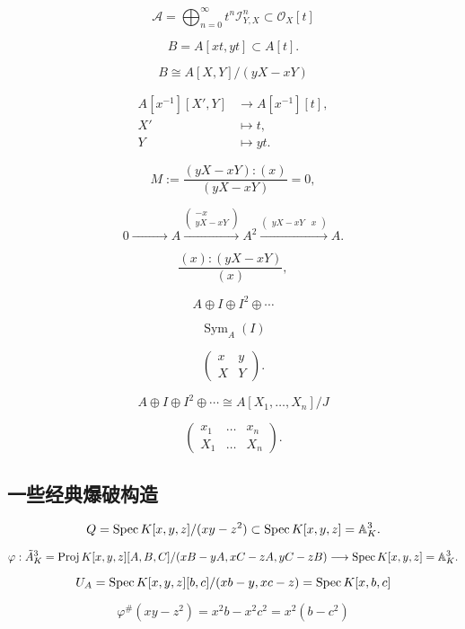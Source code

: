\[
	\mathscr A=\bigoplus_{n=0}^\infty t^n\mathscr I_{Y,X}^n\subset \mathscr O_X[t]
\]


\[
	B=A[xt,yt]\subset A[t].
\]

\[
	B\cong A[X,Y]/(yX-xY)
\]

\[
	\begin{aligned}
		A[x^{-1}][X',Y] & \longrightarrow A[x^{-1}][t],\\
		X' &\longmapsto t,\\
		Y  &\longmapsto yt.
	\end{aligned}
\]

\[
	M:=\frac{(yX-xY):(x)}{(yX-xY)}=0,
\]

\[
	0\xrightarrow{\qquad\quad\quad} A \xrightarrow{
	\begin{pmatrix}
		-x\\ yX-xY
	\end{pmatrix}}A^2
	\xrightarrow{\begin{pmatrix}
		yX-xY& x
	\end{pmatrix}}A.
\]

\[
	\frac{(x):(yX-xY)}{(x)},
\]


\[
	A\oplus I \oplus I^2\oplus \cdots
\]

\[
	\operatorname{Sym}_A(I)
\]

\[
	\begin{pmatrix}
		x&y\\
		X&Y
	\end{pmatrix}.
\]

\[
	A\oplus I \oplus I^2\oplus \cdots\cong A[X_1,\dots,X_n]/J
\]

\[
	\begin{pmatrix}
		x_1&\dots&x_n\\
		X_1&\dots&X_n
	\end{pmatrix}.
\]

\subsection{一些经典爆破构造}\label{s:4.2.2}

\[
	Q=\operatorname{Spec} K[x,y,z]/(xy-z^2)\subset \operatorname{Spec} K[x,y,z]=\mathbb A_K^3.
\]

\[
	\varphi:\tilde A_K^3=\operatorname{Proj} K[x,y,z][A,B,C]/(xB-yA,xC-zA,yC-zB)\longrightarrow \operatorname{Spec} K[x,y,z]=\mathbb A_K^3.
\]

\[
	U_A=\operatorname{Spec} K[x,y,z][b,c]/(xb-y,xc-z)=\operatorname{Spec} K[x,b,c]
\]

\[
	\varphi^\# (xy-z^2)=x^2b-x^2c^2=x^2(b-c^2)
\]

